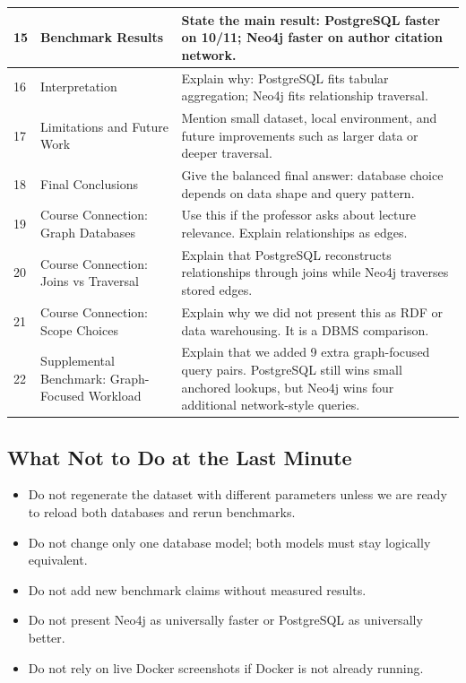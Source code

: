 \documentclass[11pt]{article}
\begin{document}
\begin{longtable}{|p{}|p{}|p{}|}
\hline
15 & Benchmark Results & State the main result: PostgreSQL faster on 10/11; Neo4j faster on author citation network. \\
\hline
16 & Interpretation & Explain why: PostgreSQL fits tabular aggregation; Neo4j fits relationship traversal. \\
\hline
17 & Limitations and Future Work & Mention small dataset, local environment, and future improvements such as larger data or deeper traversal. \\
\hline
18 & Final Conclusions & Give the balanced final answer: database choice depends on data shape and query pattern. \\
\hline
19 & Course Connection: Graph Databases & Use this if the professor asks about lecture relevance. Explain relationships as edges. \\
\hline
20 & Course Connection: Joins vs Traversal & Explain that PostgreSQL reconstructs relationships through joins while Neo4j traverses stored edges. \\
\hline
21 & Course Connection: Scope Choices & Explain why we did not present this as RDF or data warehousing. It is a DBMS comparison. \\
\hline
22 & Supplemental Benchmark: Graph-Focused Workload & Explain that we added 9 extra graph-focused query pairs. PostgreSQL still wins small anchored lookups, but Neo4j wins four additional network-style queries. \\
\hline
\end{longtable}

\subsection{What Not to Do at the Last Minute}

\begin{itemize}
    \item Do not regenerate the dataset with different parameters unless we are ready to reload both databases and rerun benchmarks.
    \item Do not change only one database model; both models must stay logically equivalent.
    \item Do not add new benchmark claims without measured results.
    \item Do not present Neo4j as universally faster or PostgreSQL as universally better.
    \item Do not rely on live Docker screenshots if Docker is not already running.
\end{itemize}
\end{document}
